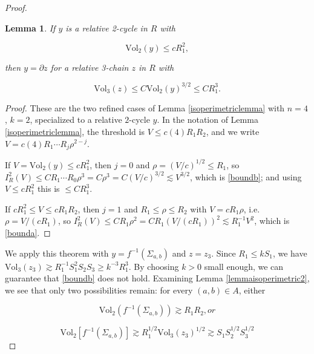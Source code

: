 \documentclass{amsart}
\newtheorem*{theorem 1}{Theorem 1}
\newtheorem*{theorem 2}{Theorem 2}
\newtheorem*{theorem 3}{Theorem 3}
\newtheorem{lemma}{Lemma}[section]
\numberwithin{equation}{section}
\newcommand{\Vol}{\textrm{Vol}}
\begin{document}
\begin{proof}
\begin{lemma}
If $y$ is a relative 2-cycle in $R$ with

\begin{equation} \label{caseb} \Vol_2(y) \le c R_1^2,  \end{equation}

then $y = \partial z$ for a relative 3-chain $z$ in $R$ with

\begin{equation} \label{boundb}  \Vol_3(z) \le C \Vol_2(y)^{3/2} \le C R_1^3.  \end{equation}

\end{lemma}

\begin{proof} These are the two refined cases of
Lemma \ref{isoperimetriclemma} with $n = 4$, $k = 2$, specialized
to a relative $2$-cycle $y$.  In the notation of
Lemma \ref{isoperimetriclemma}, the threshold is $V \le c(4) R_1
R_2$, and we write $V = c(4) R_1 \cdots R_j \rho^{2-j}$.

If $V = \Vol_2(y) \le c R_1^2$, then $j = 0$ and $\rho =
(V/c)^{1/2} \le R_1$, so
$I_R^2(V) \le C R_1 \cdots R_0 \rho^{3} = C \rho^3 = C
(V/c)^{3/2} \lesssim V^{3/2}$, which is \eqref{boundb}; and using
$V \le c R_1^2$ this is $\le C R_1^3$.

If $c R_1^2 \le V \le c R_1 R_2$, then $j = 1$ and $R_1 \le \rho
\le R_2$ with $V = c R_1 \rho$, i.e. $\rho = V/(c R_1)$, so
$I_R^2(V) \le C R_1 \rho^{2} = C R_1 (V/(c R_1))^2 \lesssim R_1^{-1}
V^2$, which is \eqref{bounda}.
\end{proof}

We apply this theorem with $y = f^{-1}(\Sigma_{a,b})$ and $z = z_3$.   Since $R_1 \le k S_1$,  we have $\Vol_3(z_3) \gtrsim R_1^{-1} S_1^2 S_2 S_3 \ge k^{-3} R_1^3$.   By choosing $k > 0$ small enough,  we can guarantee that \eqref{boundb} does not hold.   Examining Lemma \ref{lemmaisoperimetric2},  we see that only two possibilities remain: for every $(a,b) \in A$,  either

\begin{equation} \label{casei} \Vol_2(f^{-1}(\Sigma_{a,b})) \gtrsim R_1 R_2,  or \end{equation}

\begin{equation} \label{caseii} \Vol_2[f^{-1}(\Sigma_{a,b})] \gtrsim R_1^{1/2} \Vol_3(z_3)^{1/2} \gtrsim S_1 S_2^{1/2} S_3^{1/2} \end{equation}


\end{proof}
\end{document}
